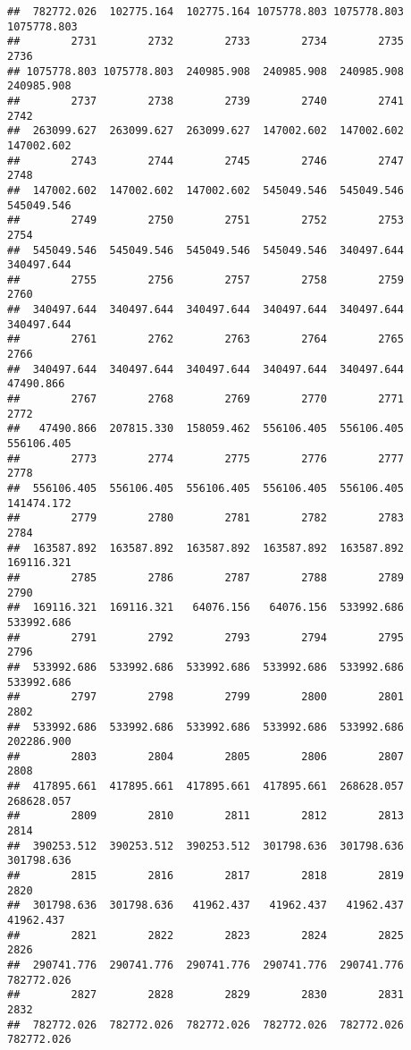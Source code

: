 \documentclass[
]{book}
\begin{document}
\begin{verbatim}
##  782772.026  102775.164  102775.164 1075778.803 1075778.803 1075778.803 
##        2731        2732        2733        2734        2735        2736 
## 1075778.803 1075778.803  240985.908  240985.908  240985.908  240985.908 
##        2737        2738        2739        2740        2741        2742 
##  263099.627  263099.627  263099.627  147002.602  147002.602  147002.602 
##        2743        2744        2745        2746        2747        2748 
##  147002.602  147002.602  147002.602  545049.546  545049.546  545049.546 
##        2749        2750        2751        2752        2753        2754 
##  545049.546  545049.546  545049.546  545049.546  340497.644  340497.644 
##        2755        2756        2757        2758        2759        2760 
##  340497.644  340497.644  340497.644  340497.644  340497.644  340497.644 
##        2761        2762        2763        2764        2765        2766 
##  340497.644  340497.644  340497.644  340497.644  340497.644   47490.866 
##        2767        2768        2769        2770        2771        2772 
##   47490.866  207815.330  158059.462  556106.405  556106.405  556106.405 
##        2773        2774        2775        2776        2777        2778 
##  556106.405  556106.405  556106.405  556106.405  556106.405  141474.172 
##        2779        2780        2781        2782        2783        2784 
##  163587.892  163587.892  163587.892  163587.892  163587.892  169116.321 
##        2785        2786        2787        2788        2789        2790 
##  169116.321  169116.321   64076.156   64076.156  533992.686  533992.686 
##        2791        2792        2793        2794        2795        2796 
##  533992.686  533992.686  533992.686  533992.686  533992.686  533992.686 
##        2797        2798        2799        2800        2801        2802 
##  533992.686  533992.686  533992.686  533992.686  533992.686  202286.900 
##        2803        2804        2805        2806        2807        2808 
##  417895.661  417895.661  417895.661  417895.661  268628.057  268628.057 
##        2809        2810        2811        2812        2813        2814 
##  390253.512  390253.512  390253.512  301798.636  301798.636  301798.636 
##        2815        2816        2817        2818        2819        2820 
##  301798.636  301798.636   41962.437   41962.437   41962.437   41962.437 
##        2821        2822        2823        2824        2825        2826 
##  290741.776  290741.776  290741.776  290741.776  290741.776  782772.026 
##        2827        2828        2829        2830        2831        2832 
##  782772.026  782772.026  782772.026  782772.026  782772.026  782772.026 

\end{verbatim}
\end{document}
